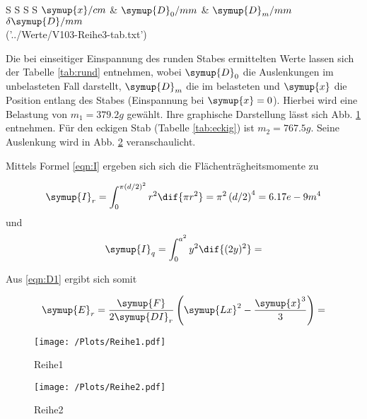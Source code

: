 \begin{table}
  \centering
\caption{Auslenkung des eckigen Stabes bei einseitiger Einspannung}
\label{tab:eckig}
\begin{tabular}{S S S S}
  \toprule
  {$\symup{x}/cm$} & {$\symup{D}_0/mm$} & {$\symup{D}_m/mm$} {$\delta \symup{D}/mm$}\\
  \midrule
  ('../Werte/V103-Reihe3-tab.txt')
\bottomrule
\end{tabular}
\end{table}
\FloatBarrier

Die bei einseitiger Einspannung des runden Stabes ermittelten Werte lassen sich der Tabelle \ref{tab:rund} entnehmen, wobei $\symup{D}_0$ die Auslenkungen im unbelasteten Fall darstellt, $\symup{D}_m$ die im belasteten und $\symup{x}$ die Position entlang des Stabes (Einspannung bei $\symup{x}=0$). Hierbei wird eine Belastung von $m_1 = 379.2g$ gewählt. Ihre graphische Darstellung lässt sich Abb. \ref{fig:Reihe1} entnehmen.
Für den eckigen Stab (Tabelle \ref{tab:eckig}) ist $m_2 = 767.5g$. Seine Auslenkung wird in Abb. \ref{fig:Reihe2} veranschaulicht.

Mittels Formel \eqref{eqn:I} ergeben sich sich die Flächenträgheitsmomente zu

\begin{equation}
    \symup{I}_{r} = \int_{0}^{\pi (d/2)^2} r^2 \dif{\pi r^2} = \pi^2 \left( d/2 \right)^4 = 6.17e-9 m^4
\end{equation}
 und
\begin{equation}
  \symup{I}_{q} = \int_{0}^{a^2} y^2 \dif{(2y)^2} =
\end{equation}

Aus \ref{eqn:D1} ergibt sich somit

\begin{equation}
  \symup{E}_{r} = \frac{\symup{F}}{2\symup{DI}_{r}} \left( \symup{Lx}^2 - \frac{\symup{x}^3}{3} \right) =
\end{equation}

\begin{figure}
  \centering
  \texttt{[image: /Plots/Reihe1.pdf]}
  \caption{Reihe1}
  \label{fig:Reihe1}
\end{figure}

\begin{figure}
  \centering
  \texttt{[image: /Plots/Reihe2.pdf]}
  \caption{Reihe2}
  \label{fig:Reihe2}
\end{figure}
\FloatBarrier

